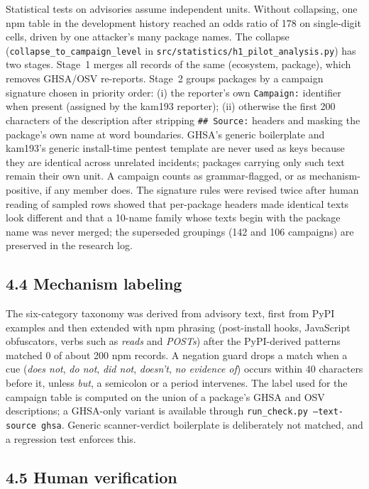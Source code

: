 \documentclass[preprint,12pt]{elsarticle}
\begin{document}
Statistical tests on advisories assume independent units. Without collapsing, one npm table in the development history reached an odds ratio of 178 on single-digit cells, driven by one attacker's many package names. The collapse (\texttt{collapse\_to\_campaign\_level} in \texttt{src/statistics/h1\_pilot\_analysis.py}) has two stages. Stage~1 merges all records of the same (ecosystem, package), which removes GHSA/OSV re-reports. Stage~2 groups packages by a campaign signature chosen in priority order: (i) the reporter's own \texttt{Campaign:} identifier when present (assigned by the kam193 reporter); (ii) otherwise the first 200 characters of the description after stripping \texttt{\#\# Source:} headers and masking the package's own name at word boundaries. GHSA's generic boilerplate and kam193's generic install-time pentest template are never used as keys because they are identical across unrelated incidents; packages carrying only such text remain their own unit. A campaign counts as grammar-flagged, or as mechanism-positive, if any member does. The signature rules were revised twice after human reading of sampled rows showed that per-package headers made identical texts look different and that a 10-name family whose texts begin with the package name was never merged; the superseded groupings (142 and 106 campaigns) are preserved in the research log.

\subsection*{4.4 Mechanism labeling}

The six-category taxonomy was derived from advisory text, first from PyPI examples and then extended with npm phrasing (post-install hooks, JavaScript obfuscators, verbs such as \emph{reads} and \emph{POSTs}) after the PyPI-derived patterns matched 0 of about 200 npm records. A negation guard drops a match when a cue (\emph{does not}, \emph{do not}, \emph{did not}, \emph{doesn't}, \emph{no evidence of}) occurs within 40 characters before it, unless \emph{but}, a semicolon or a period intervenes. The label used for the campaign table is computed on the union of a package's GHSA and OSV descriptions; a GHSA-only variant is available through \texttt{run\_check.py --text-source ghsa}. Generic scanner-verdict boilerplate is deliberately not matched, and a regression test enforces this.

\subsection*{4.5 Human verification}
\end{document}
